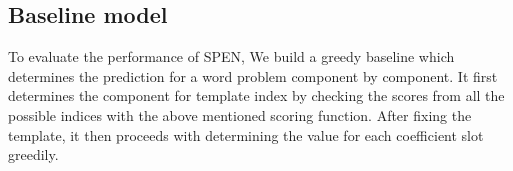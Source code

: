 \documentclass[11pt,letterpaper]{article}
\begin{document}
\subsection{Baseline model}
To evaluate the performance of SPEN, We build a greedy baseline which determines the prediction for a word problem component by component. It first determines the component for template index by checking the scores from all the possible indices with the above mentioned scoring function. After fixing the template, it then proceeds with determining the value for each coefficient slot greedily.
\end{document}

